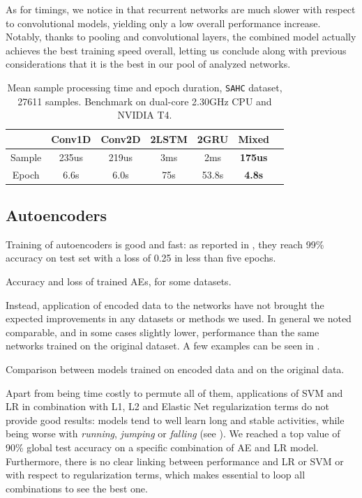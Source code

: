 As for timings, we notice in  that recurrent networks are much slower with respect to convolutional models, yielding only a low overall performance increase.
Notably, thanks to pooling and convolutional layers, the combined model actually achieves the best training speed overall, letting us conclude along with previous considerations that it is the best in our pool of analyzed networks.

\begin{table}[ht]
\centering
\caption{Mean sample processing time and epoch duration, \texttt{SAHC} dataset, 27611 samples. Benchmark on dual-core 2.30GHz CPU and NVIDIA\textregistered{} T4.}
\label{tab:timings}
\begin{tabular}{c|cccccc}\toprule
       & Conv1D & Conv2D  & 2LSTM & 2GRU  & Mixed \\\midrule
Sample & 235us  & 219us   & 3ms   & 2ms   & \textbf{175us} \\
Epoch  & 6.6s    & 6.0s   & 75s   & 53.8s & \textbf{4.8s}  \\\bottomrule
\end{tabular}
\end{table}

\subsection{Autoencoders}
Training of autoencoders is good and fast: as reported in , they reach 99\% accuracy on test set with a loss of 0.25 in less than five epochs.

\begin{table}[ht]
\centering
\caption{Accuracy and loss of trained AEs, for some datasets.}
\label{tab:ae_train}

\end{table}

Instead, application of encoded data to the networks have not brought the expected improvements in any datasets or methods we used.
In general we noted comparable, and in some cases slightly lower, performance than the same networks trained on the original dataset. A few examples can be seen in .

\begin{table}[ht]
\centering
\caption{Comparison between models trained on encoded data and on the original data.}
\label{tab:ae_comp}

\end{table}

Apart from being time costly to permute all of them, applications of SVM and LR in combination with L1, L2 and Elastic Net regularization terms do not provide good results: models tend to well learn long and stable activities, while being worse with \textit{running}, \textit{jumping} or \textit{falling} (see ).
We reached a top value of 90\% global test accuracy on a specific combination of AE and LR model.
Furthermore, there is no clear linking between performance and LR or SVM or with respect to regularization terms, which makes essential to loop all combinations to see the best one.

